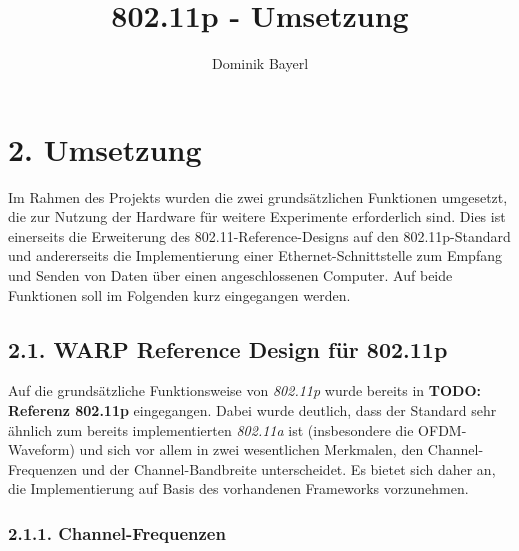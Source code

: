 \documentclass[ngerman,]{scrartcl}
\title{802.11p - Umsetzung}
\author{Dominik Bayerl}
\date{}
\begin{document}
\maketitle

\newcommand{\plusnamesingular}{}
\newcommand{\starnamesingular}{}
\newcommand{\xrefname}[1]{\protect\renewcommand{\plusnamesingular}{#1}}
\newcommand{\Xrefname}[1]{\protect\renewcommand{\starnamesingular}{#1}}
\providecommand{\cref}{\plusnamesingular~\ref}
\providecommand{\Cref}{\starnamesingular~\ref}
\providecommand{\crefformat}[2]{}
\providecommand{\Crefformat}[2]{}

\crefformat{figure}{fig.~#2#1#3}
\Crefformat{figure}{Figure~#2#1#3}
\crefformat{table}{Tab.~#2#1#3}
\Crefformat{table}{Table~#2#1#3}

\section{2. Umsetzung}\label{umsetzung}

Im Rahmen des Projekts wurden die zwei grundsätzlichen Funktionen
umgesetzt, die zur Nutzung der Hardware für weitere Experimente
erforderlich sind. Dies ist einerseits die Erweiterung des
802.11-Reference-Designs auf den 802.11p-Standard und andererseits die
Implementierung einer Ethernet-Schnittstelle zum Empfang und Senden von
Daten über einen angeschlossenen Computer. Auf beide Funktionen soll im
Folgenden kurz eingegangen werden.

\subsection{2.1. WARP Reference Design für
802.11p}\label{warp-reference-design-fuxfcr-802.11p}

Auf die grundsätzliche Funktionsweise von \emph{802.11p} wurde bereits
in \textbf{TODO: Referenz 802.11p} eingegangen. Dabei wurde deutlich,
dass der Standard sehr ähnlich zum bereits implementierten
\emph{802.11a} ist (insbesondere die OFDM-Waveform) und sich vor allem
in zwei wesentlichen Merkmalen, den Channel-Frequenzen und der
Channel-Bandbreite unterscheidet. Es bietet sich daher an, die
Implementierung auf Basis des vorhandenen Frameworks vorzunehmen.

\subsubsection{2.1.1. Channel-Frequenzen}\label{channel-frequenzen}
\end{document}
